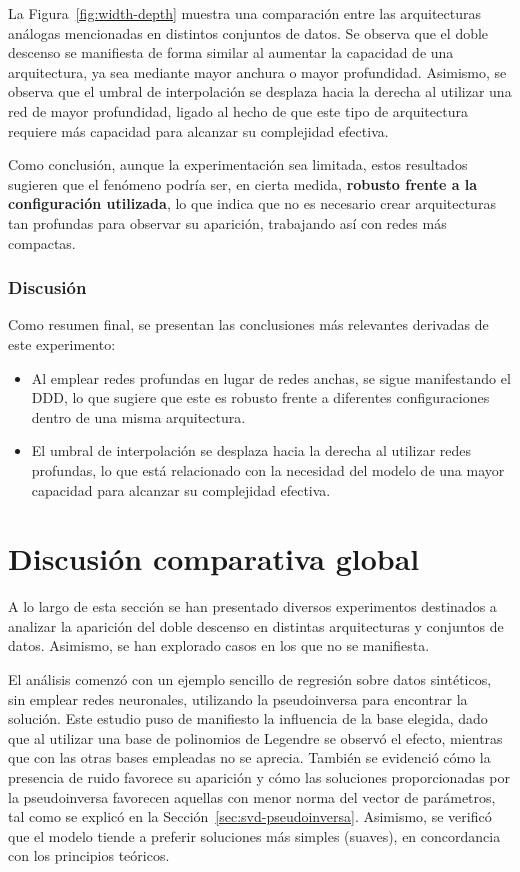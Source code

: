 La Figura~\ref{fig:width-depth} muestra una comparación entre las arquitecturas análogas mencionadas en distintos conjuntos de datos. Se observa que el doble descenso se manifiesta de forma similar al aumentar la capacidad de una arquitectura, ya sea mediante mayor anchura o mayor profundidad. Asimismo, se observa que el umbral de interpolación se desplaza hacia la derecha al utilizar una red de mayor profundidad, ligado al hecho de que este tipo de arquitectura requiere más capacidad para alcanzar su complejidad efectiva.

Como conclusión, aunque la experimentación sea limitada, estos resultados sugieren que el fenómeno podría ser, en cierta medida, \textbf{robusto frente a la configuración utilizada}, lo que indica que no es necesario crear arquitecturas tan profundas para observar su aparición, trabajando así con redes más compactas.

\subsubsection{Discusión}\label{subsubsec:discusion-width-depth}

Como resumen final, se presentan las conclusiones más relevantes derivadas de este experimento:

\begin{itemize}
    \item Al emplear redes profundas en lugar de redes anchas, se sigue manifestando el DDD, lo que sugiere que este es robusto frente a diferentes configuraciones dentro de una misma arquitectura.
    \item El umbral de interpolación se desplaza hacia la derecha al utilizar redes profundas, lo que está relacionado con la necesidad del modelo de una mayor capacidad para alcanzar su complejidad efectiva.
\end{itemize}

\section{Discusión comparativa global}\label{sec:conclusion-informatica}

A lo largo de esta sección se han presentado diversos experimentos destinados a analizar la aparición del doble descenso en distintas arquitecturas y conjuntos de datos. Asimismo, se han explorado casos en los que no se manifiesta.

El análisis comenzó con un ejemplo sencillo de regresión sobre datos sintéticos, sin emplear redes neuronales, utilizando la pseudoinversa para encontrar la solución. Este estudio puso de manifiesto la influencia de la base elegida, dado que al utilizar una base de polinomios de Legendre se observó el efecto, mientras que con las otras bases empleadas no se aprecia. También se evidenció cómo la presencia de ruido favorece su aparición y cómo las soluciones proporcionadas por la pseudoinversa favorecen aquellas con menor norma del vector de parámetros, tal como se explicó en la Sección~\ref{sec:svd-pseudoinversa}. Asimismo, se verificó que el modelo tiende a preferir soluciones más simples (suaves), en concordancia con los principios teóricos.

